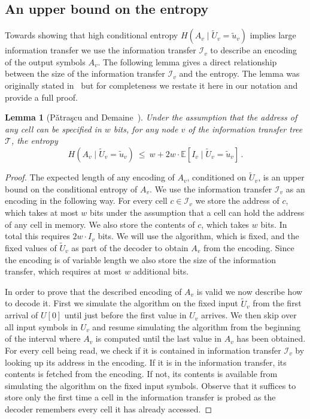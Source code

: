 \documentclass[11pt]{article}
\numberwithin{equation}{section}
\newtheorem{lemma}[theorem]{Lemma}
\theoremstyle{definition}
\theoremstyle{plain}
\newcommand{\calT}{\ensuremath{\mathcal{T}}}
\newcommand{\expected}[1]{\ensuremath{\mathbb{E}[#1]}}
\newcommand{\Xv}{\ensuremath{U_v}}
\newcommand{\Xvknown}{\ensuremath{\widetilde{U}_v}}
\newcommand{\Xvfix}{\ensuremath{\widetilde{u}_v}}
\newcommand{\Yv}{\ensuremath{A_v}}
\newcommand{\vitset}{\ensuremath{\mathcal{I}_v}}
\newcommand{\vit}{\ensuremath{I_v}}
\newcommand{\Patrascu}{P{\v a}tra{\c s}cu\xspace}
\begin{document}
\subsection{An upper bound on the entropy}\label{sec:entropyupper}

Towards showing that high conditional entropy  $H(\Yv\mid\Xvknown=\Xvfix)$ implies large information transfer we use the information transfer $\vitset$ to describe an encoding of the output symbols $\Yv$. The following lemma gives a direct relationship between the size of the information transfer $\vitset$ and the entropy.
The lemma was originally stated in~\cite{PD2006:Low-Bounds} but for completeness we restate it here in our notation and provide a full proof.

\begin{lemma}[\Patrascu and Demaine~\cite{PD2006:Low-Bounds}]\label{lem:H-upper-old}
	Under the assumption that the address of any cell can be specified in $w$ bits, for any node $v$ of the information transfer tree $\calT$, the entropy 
	$$
	H(\Yv\mid\Xvknown=\Xvfix)~\leq~w + 2w\cdot \expected{\vit \mid \Xvknown=\Xvfix}\,.
	$$
\end{lemma}
\begin{proof}
	The expected length of any encoding of $\Yv$, conditioned on $\Xvknown$, is an upper bound on the conditional entropy of $\Yv$.
	We use the information transfer $\vitset$ as an encoding in the following way. For every cell $c\in\vitset$ we store the address of $c$, which takes at most $w$ bits under the assumption that a cell can hold the address of any cell in memory.
	We also store the contents of $c$, which takes $w$ bits.
	In total this requires $2w\cdot \vit$ bits.
	We will use the algorithm, which is fixed, and the fixed values of $\Xvknown$ as part of the decoder to obtain $\Yv$ from the encoding. Since the encoding is of variable length we also store the size of the information transfer, which requires at most $w$ additional bits.
	
	In order to prove that the described encoding of $\Yv$ is valid we now describe how to decode it.
	First we simulate the algorithm on the fixed input $\Xvknown$ from the first arrival of $U[0]$ until just before the first value in $\Xv$ arrives.
	We then skip over all input symbols in $\Xv$
	and resume simulating the algorithm from the beginning of the interval
	where $\Yv$ is %
	computed until the last value in $\Yv$ has been obtained.
	For every cell being read, we check if it is contained in information transfer $\vitset$ by looking up its address in the encoding.
	If it is in the information transfer, its contents is fetched from the encoding. If not, its contents is available from simulating the algorithm on the fixed input symbols.
	Observe that it suffices to
	store only the first time a cell in the information transfer is probed as the decoder
	remembers every cell it has already accessed.
\end{proof}
\end{document}
